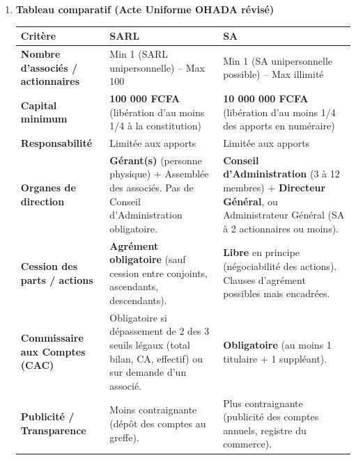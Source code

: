 \documentclass[11pt]{article}
\begin{document}
\begin{corrige}
\begin{enumerate}
    \item \textbf{Tableau comparatif (Acte Uniforme OHADA révisé)}
    \begin{center}
    \begin{tabularx}{\linewidth}{|l|X|X|}\hline
    \rowcolor{popblueL}
    \textbf{Critère} & \textbf{SARL} & \textbf{SA} \\ \hline
    \textbf{Nombre d'associés / actionnaires} & Min 1 (SARL unipersonnelle) -- Max 100 & Min 1 (SA unipersonnelle possible) -- Max illimité \\ \hline
    \textbf{Capital minimum} & \textbf{100 000 FCFA} (libération d'au moins 1/4 à la constitution) & \textbf{10 000 000 FCFA} (libération d'au moins 1/4 des apports en numéraire) \\ \hline
    \textbf{Responsabilité} & Limitée aux apports & Limitée aux apports \\ \hline
    \textbf{Organes de direction} & \textbf{Gérant(s)} (personne physique) + Assemblée des associés. Pas de Conseil d'Administration obligatoire. & \textbf{Conseil d'Administration} (3 à 12 membres) + \textbf{Directeur Général}, ou Administrateur Général (SA à 2 actionnaires ou moins). \\ \hline
    \textbf{Cession des parts / actions} & \textbf{Agrément obligatoire} (sauf cession entre conjoints, ascendants, descendants). & \textbf{Libre} en principe (négociabilité des actions). Clauses d'agrément possibles mais encadrées. \\ \hline
    \textbf{Commissaire aux Comptes (CAC)} & Obligatoire si dépassement de 2 des 3 seuils légaux (total bilan, CA, effectif) ou sur demande d'un associé. & \textbf{Obligatoire} (au moins 1 titulaire + 1 suppléant). \\ \hline
    \textbf{Publicité / Transparence} & Moins contraignante (dépôt des comptes au greffe). & Plus contraignante (publicité des comptes annuels, registre du commerce). \\ \hline
    \end{tabularx}
    \end{center}


\end{enumerate}
\end{corrige}
\end{document}
